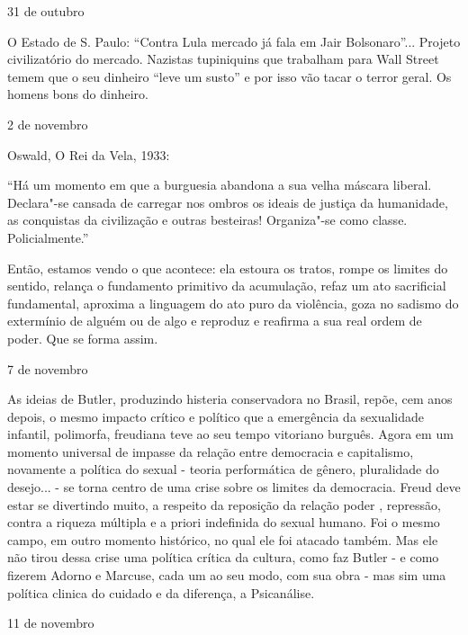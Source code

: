 \begin{flushright}
31 de outubro
\end{flushright}

O Estado de S. Paulo: ``Contra Lula mercado já fala em Jair
Bolsonaro''... Projeto civilizatório do mercado. Nazistas tupiniquins
que trabalham para Wall Street temem que o seu dinheiro ``leve um
susto'' e por isso vão tacar o terror geral. Os homens bons do dinheiro.

\begin{flushright}
2 de novembro
\end{flushright}

Oswald, O Rei da Vela, 1933:

``Há um momento em que a burguesia abandona a sua velha máscara liberal.
Declara"-se cansada de carregar nos ombros os ideais de justiça da
humanidade, as conquistas da civilização e outras besteiras! Organiza"-se
como classe. Policialmente.''

Então, estamos vendo o que acontece: ela estoura os tratos, rompe os
limites do sentido, relança o fundamento primitivo da acumulação, refaz
um ato sacrificial fundamental, aproxima a linguagem do ato puro da
violência, goza no sadismo do extermínio de alguém ou de algo e reproduz
e reafirma a sua real ordem de poder. Que se forma assim.

\begin{flushright}
7 de novembro
\end{flushright}

As ideias de Butler, produzindo histeria conservadora no Brasil, repõe,
cem anos depois, o mesmo impacto crítico e político que a emergência da
sexualidade infantil, polimorfa, freudiana teve ao seu tempo vitoriano
burguês. Agora em um momento universal de impasse da relação entre
democracia e capitalismo, novamente a política do sexual - teoria
performática de gênero, pluralidade do desejo... - se torna centro de
uma crise sobre os limites da democracia. Freud deve estar se divertindo
muito, a respeito da reposição da relação poder , repressão, contra a
riqueza múltipla e a priori indefinida do sexual humano. Foi o mesmo
campo, em outro momento histórico, no qual ele foi atacado também. Mas
ele não tirou dessa crise uma política crítica da cultura, como faz
Butler - e como fizerem Adorno e Marcuse, cada um ao seu modo, com sua
obra - mas sim uma política clinica do cuidado e da diferença, a
Psicanálise.

\begin{flushright}
11 de novembro
\end{flushright}

